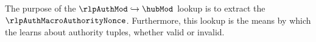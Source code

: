 The purpose of the $\rlpAuthMod \hookrightarrow \hubMod$ lookup is to extract the $\rlpAuthMacroAuthorityNonce$.
Furthermore, this lookup is the means by which the \hubMod{} learns about authority tuples, whether valid or invalid.
